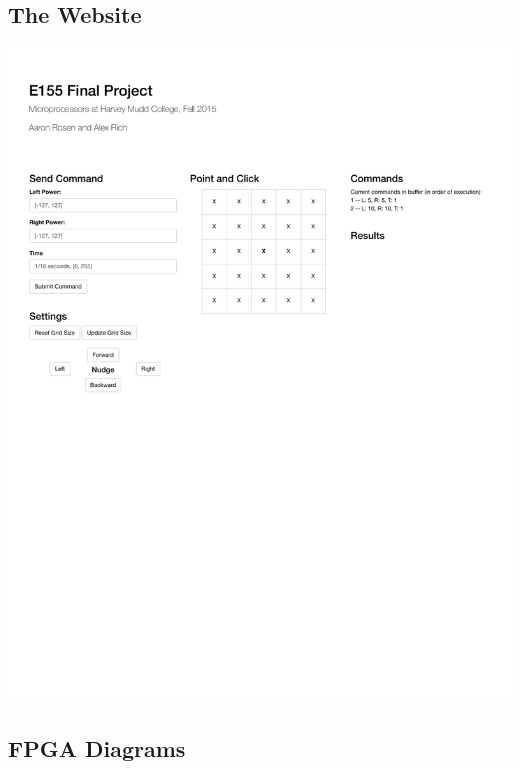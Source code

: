 \documentclass[12pt]{article}
\begin{document}
\subsection{The Website}
\label{sec:web}
\includegraphics[width=\textwidth]{website.pdf}

\subsection{FPGA Diagrams}
\end{document}
